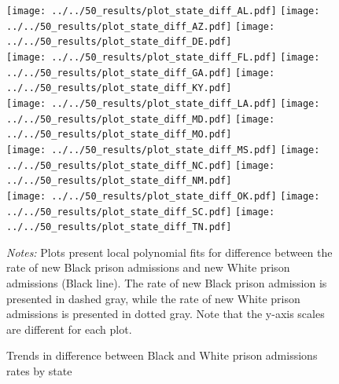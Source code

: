 \documentclass[12pt]{article}
\begin{document}
 \begin{figure}[h!]
 	\begin{center}
 	\caption{Trends in difference between Black and White prison admissions rates by state}
 	\small

 		\vspace{.1in}
       \texttt{[image: ../../50\_results/plot\_state\_diff\_AL.pdf]}
 		\texttt{[image: ../../50\_results/plot\_state\_diff\_AZ.pdf]}
       \texttt{[image: ../../50\_results/plot\_state\_diff\_DE.pdf]}\\

       \vspace{.01in}
 			\texttt{[image: ../../50\_results/plot\_state\_diff\_FL.pdf]}
       \texttt{[image: ../../50\_results/plot\_state\_diff\_GA.pdf]}
       \texttt{[image: ../../50\_results/plot\_state\_diff\_KY.pdf]}\\

       \vspace{.01in}
      \texttt{[image: ../../50\_results/plot\_state\_diff\_LA.pdf]}
 			\texttt{[image: ../../50\_results/plot\_state\_diff\_MD.pdf]}
 			\texttt{[image: ../../50\_results/plot\_state\_diff\_MO.pdf]} \\

       \vspace{.01in}
       \texttt{[image: ../../50\_results/plot\_state\_diff\_MS.pdf]}
       \texttt{[image: ../../50\_results/plot\_state\_diff\_NC.pdf]}
       \texttt{[image: ../../50\_results/plot\_state\_diff\_NM.pdf]}\\

       \vspace{.01in}
       \texttt{[image: ../../50\_results/plot\_state\_diff\_OK.pdf]}
 			\texttt{[image: ../../50\_results/plot\_state\_diff\_SC.pdf]}
 			\texttt{[image: ../../50\_results/plot\_state\_diff\_TN.pdf]}
       \smallskip
 	\label{figure_difference_states1}
 	\end{center}
   {\singlespacing \scriptsize{\emph{Notes:} Plots present local polynomial fits for difference between the rate of new Black prison admissions and new White prison admissions (Black line).  The rate of new Black prison admission is presented in dashed gray, while the rate of new White prison admissions is presented in dotted gray. Note that the y-axis scales are different for each plot.}}
\end{figure} \normalsize
\end{document}
